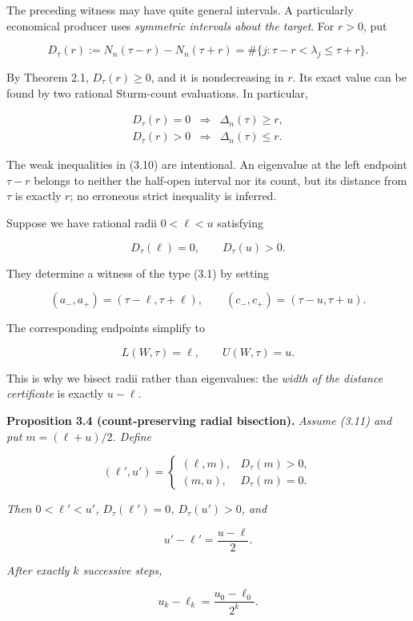\documentclass[
  11pt,
]{article}
\begin{document}
The preceding witness may have quite general intervals. A particularly
economical producer uses \emph{symmetric intervals about the target}.
For \(r>0\), put

\[
D_\tau(r):=N_n(\tau-r)-N_n(\tau+r)
=\#\{j:\tau-r<\lambda_j\le\tau+r\}.
\tag{3.9}
\]

By Theorem 2.1, \(D_\tau(r)\ge0\), and it is nondecreasing in \(r\). Its
exact value can be found by two rational Sturm-count evaluations. In
particular,

\[
\begin{array}{rcl}
D_\tau(r)=0&\Longrightarrow&\Delta_n(\tau)\ge r,\\
D_\tau(r)>0&\Longrightarrow&\Delta_n(\tau)\le r.
\end{array}
\tag{3.10}
\]

The weak inequalities in (3.10) are intentional. An eigenvalue at the
left endpoint \(\tau-r\) belongs to neither the half-open interval nor
its count, but its distance from \(\tau\) is exactly \(r\); no erroneous
strict inequality is inferred.

Suppose we have rational radii \(0<\ell<u\) satisfying

\[
D_\tau(\ell)=0,
\qquad D_\tau(u)>0.
\tag{3.11}
\]

They determine a witness of the type (3.1) by setting

\[
(a_-,a_+)=(\tau-\ell,\tau+\ell),
\qquad
(c_-,c_+)=(\tau-u,\tau+u).
\tag{3.12}
\]

The corresponding endpoints simplify to

\[
L(W,\tau)=\ell,
\qquad U(W,\tau)=u.
\tag{3.13}
\]

This is why we bisect radii rather than eigenvalues: the \emph{width of
the distance certificate} is exactly \(u-\ell\).

\textbf{Proposition 3.4 (count-preserving radial bisection).}
\emph{Assume (3.11) and put \(m=(\ell+u)/2\). Define}

\[
(\ell',u')=
\begin{cases}
(\ell,m),&D_\tau(m)>0,\\
(m,u),&D_\tau(m)=0.
\end{cases}
\tag{3.14}
\]

\emph{Then \(0<\ell'<u'\), \(D_\tau(\ell')=0\), \(D_\tau(u')>0\), and}

\[
u'-\ell'=\frac{u-\ell}{2}.
\tag{3.15}
\]

\emph{After exactly \(k\) successive steps,}

\[
u_k-\ell_k=\frac{u_0-\ell_0}{2^k}.
\tag{3.16}
\]
\end{document}
